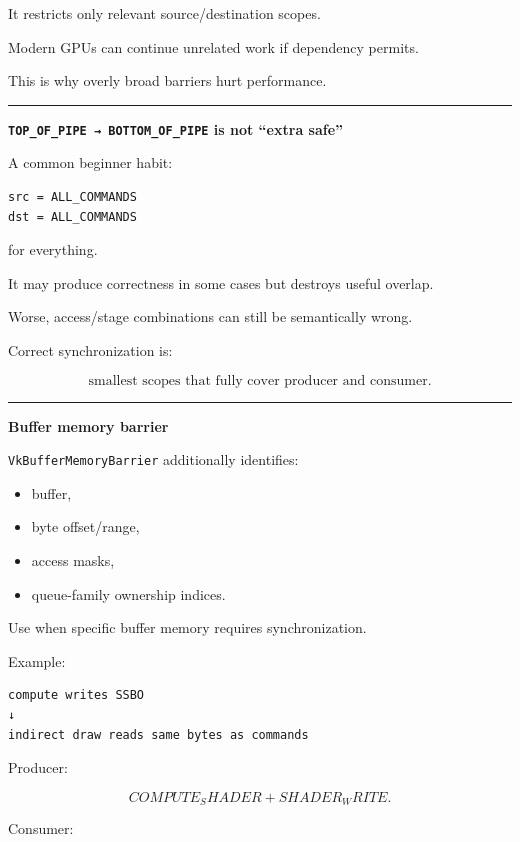 It restricts only relevant source/destination scopes.

Modern GPUs can continue unrelated work if dependency permits.

This is why overly broad barriers hurt performance.

\begin{center}\rule{0.5\linewidth}{0.5pt}\end{center}

\textbf{\texttt{TOP\_OF\_PIPE\ →\ BOTTOM\_OF\_PIPE} is not ``extra safe''}

A common beginner habit:

\begin{verbatim}
src = ALL_COMMANDS
dst = ALL_COMMANDS
\end{verbatim}

for everything.

It may produce correctness in some cases but destroys useful overlap.

Worse, access/stage combinations can still be semantically wrong.

Correct synchronization is:

\[
\boxed{
\text{smallest scopes that fully cover producer and consumer}.
}
\]

\begin{center}\rule{0.5\linewidth}{0.5pt}\end{center}

\textbf{Buffer memory barrier}

\texttt{VkBufferMemoryBarrier} additionally identifies:

\begin{itemize}
\tightlist
\item
  buffer,
\item
  byte offset/range,
\item
  access masks,
\item
  queue-family ownership indices.
\end{itemize}

Use when specific buffer memory requires synchronization.

Example:

\begin{verbatim}
compute writes SSBO
↓
indirect draw reads same bytes as commands
\end{verbatim}

Producer:

\[
COMPUTE_SHADER
+
SHADER_WRITE.
\]

Consumer:

